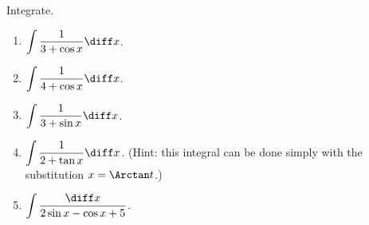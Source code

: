 Integrate.
\begin{multicols}{2}
\begin{enumerate}[ref={\fcProblemRef}]
\item \label{problemInt1/(3+cos x)dx} $\displaystyle \int \frac{1}{3+\cos x}\diff x$.

\item $\displaystyle \int \frac{1}{4+\cos x}\diff x$.

\item $\displaystyle \int \frac{1}{3+\sin x}\diff x$.

\item \label{problemInt1/(2+tan x)dx}$\displaystyle \int \frac{1}{2+\tan x}\diff x$.  (Hint: this integral can be done simply with the substitution $x=\Arctan t$.)


\item \label{problemint1/(2sinx-cosx+5)dx} $\displaystyle \int \frac{ \diff x }{ 2\sin x - \cos x +5}$.


\end{enumerate}
\end{multicols}